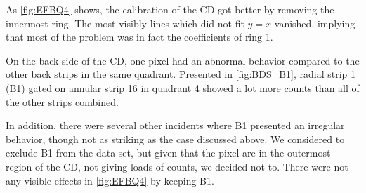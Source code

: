 \documentclass[twoside,english]{uiofysmaster/uiofysmaster}
\let\orgautoref\autoref
\renewcommand{\autoref}
        {%
		 \def\sectionautorefname{Section}%
		 \def\subsectionautorefname{Section}%
		 \def\subsubsectionautorefname{Section}%
		 \def\chapterautorefname{Chapter}%
          \orgautoref}
\begin{document}
As \autoref{fig:EFBQ4} shows, the calibration of the CD got better by removing the innermost ring. 
The most visibly lines which did not fit $y = x$ vanished, implying that most of the problem was in fact the coefficients of ring 1.

On the back side of the CD, one pixel had an abnormal behavior compared to the other back strips in the same quadrant. 
Presented in \autoref{fig:BDS_B1}, radial strip 1 (B1) gated on annular strip 16 in quadrant 4 showed a lot more counts than all of the other strips combined. 

In addition, there were several other incidents where B1 presented an irregular behavior, though not as striking as the case discussed above.
We considered to exclude B1 from the data set, but given that the pixel are in the outermost region of the CD, not giving loads of counts, we decided not to.
There were not any visible effects in \autoref{fig:EFBQ4} by keeping B1.
\end{document}
